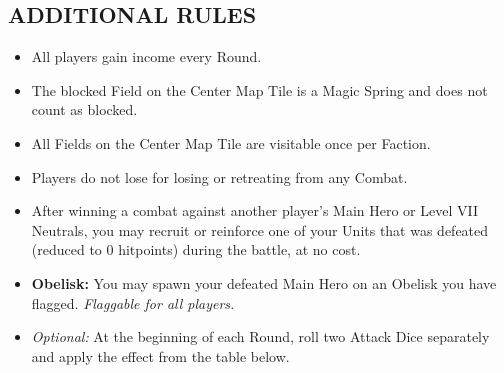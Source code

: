\begin{multicols*}{2}
\subsection*{\MakeUppercase{Additional Rules}}
\begin{itemize}
  \item All players gain income every Round.
  \item The blocked Field on the Center Map Tile is a Magic Spring and does not count as blocked.
  \item All Fields on the Center Map Tile are visitable once per Faction.
  \item Players do not lose  for losing or retreating from any Combat.
  \item After winning a combat against another player’s Main Hero or Level VII Neutrals, you may recruit or reinforce one of your Units that was defeated (reduced to 0 hitpoints) during the battle, at no cost.
  \item \textbf{Obelisk:} You may spawn your defeated Main Hero on an Obelisk you have flagged. \textit{Flaggable for all players.}
  \item \textit{Optional:} At the beginning of each Round, roll two Attack Dice separately and apply the effect from the table below.
\end{itemize}

\vspace*{\fill}


\end{multicols*}
